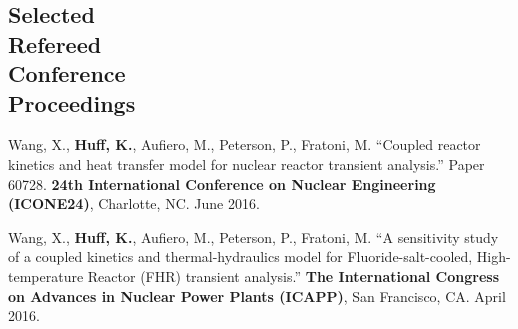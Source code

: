 \documentclass[margin,line]{resume}
\begin{document}
\begin{resume}
    \section{\mysidestyle Selected\\Refereed\\Conference\\Proceedings}
    \begin{bibenum}
      \item Wang, X., \textbf{Huff, K.}, Aufiero, M., Peterson, P., Fratoni, M.
            ``Coupled reactor kinetics and heat transfer model for nuclear 
            reactor transient analysis.'' Paper 60728.  \textbf{24th 
            International Conference on Nuclear Engineering (ICONE24)}, 
            Charlotte, NC.  June 2016. 
      \item Wang, X., \textbf{Huff, K.}, Aufiero, M., Peterson, P., Fratoni, M.
            ``A sensitivity study of a coupled kinetics and thermal-hydraulics 
            model for Fluoride-salt-cooled, High-temperature Reactor (FHR) 
            transient analysis.'' \textbf{The International 
            Congress on Advances in Nuclear Power Plants (ICAPP)}, San 
            Francisco, CA. April 2016.

\end{bibenum}
\end{resume}
\end{document}

